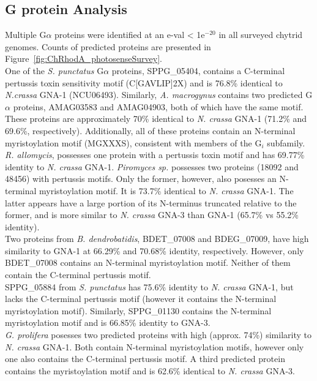 \subsection*{G protein Analysis}
Multiple G$\alpha$ proteins were identified at an e-val < 1e$^{-20}$ in all surveyed chytrid genomes. Counts of predicted proteins are presented in Figure~\ref{fig:ChRhodA_photosenseSurvey}.\\
\indent One of the \textit{S. punctatus} G$\alpha$ proteins, SPPG\_05404, contains a C-terminal pertussis toxin sensitivity motif (C[GAVLIP]{2}X) and is 76.8\% identical to \textit{N.crassa} GNA-1 (NCU06493). Similarly, \textit{A. macrogynus} contains two predicted G$\alpha$ proteins, AMAG03583 and AMAG04903, both of which have the same motif. These proteins are approximately 70\% identical to \textit{N. crassa} GNA-1 (71.2\% and 69.6\%, respectively). Additionally, all of these proteins contain an N-terminal myristoylation motif (MGXXXS), consistent with members of the G$_{i}$ subfamily. \textit{R. allomycis}, possesses one protein with a pertussis toxin motif and has 69.77\% identity to \textit{N. crassa} GNA-1. \textit{Piromyces sp.} possesses two proteins (18092 and 48456) with pertussis motifs. Only the former, however, also posesses an N-terminal myristoylation motif. It is 73.7\% identical to \textit{N. crassa} GNA-1. The latter appears have a large portion of its N-terminus truncated relative to the former, and is more similar to \textit{N. crassa} GNA-3 than GNA-1 (65.7\% vs 55.2\% identity).\\
\indent Two proteins from \textit{B. dendrobatidis}, BDET\_07008 and BDEG\_07009, have high similarity to GNA-1 at 66.29\% and 70.68\% identity, respectively. However, only BDET\_07008 contains an N-terminal myristoylation motif. Neither of them contain the C-terminal pertussis motif.\\
\indent SPPG\_05884 from \textit{S. punctatus} has 75.6\% identity to \textit{N. crassa} GNA-1, but lacks the C-terminal pertussis motif (however it contains the N-terminal myristoylation motif). Similarly, SPPG\_01130 contains the N-terminal myristoylation motif and is 66.85\% identity to GNA-3.\\
\indent \textit{G. prolifera} posesses two predicted proteins with high (approx. 74\%) similarity to \textit{N. crassa} GNA-1. Both contain N-terminal myristoylation motifs, however only one also contains the C-terminal pertussis motif. A third predicted protein contains the myristoylation motif and is 62.6\% identical to \textit{N. crassa} GNA-3.\\
